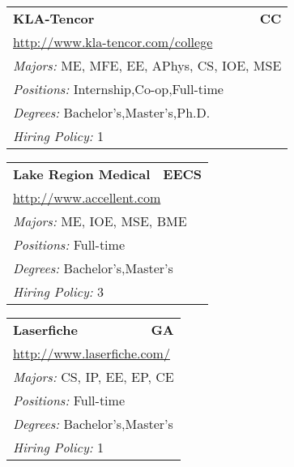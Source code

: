 \documentclass[twoside]{article}
\begin{document}
\begin{center}
\begin{multicols}{3}
\begin{FlushLeft}
\begin{minipage}{.9\columnwidth}
\end{minipage}
 
\begin{minipage}{.9\columnwidth}\begin{tabularx}{.95\columnwidth}{Xr}
                 {\Large\bf KLA-Tencor} & {\Large\bf CC}\\
    \multicolumn{2}{p{.95\columnwidth}}{\url{http://www.kla-tencor.com/college}}\\
    \multicolumn{2}{p{.95\columnwidth}}{\emph{Majors:} ME, MFE, EE, APhys, CS, IOE, MSE}\\
    \multicolumn{2}{p{.95\columnwidth}}{\emph{Positions:} Internship,Co-op,Full-time}\\
    \multicolumn{2}{p{.95\columnwidth}}{\emph{Degrees:} Bachelor's,Master's,Ph.D.}\\
    \multicolumn{2}{p{.95\columnwidth}}{\emph{Hiring Policy:} 1}\\
    \end{tabularx}
    
\end{minipage}
 
\begin{minipage}{.9\columnwidth}\begin{tabularx}{.95\columnwidth}{Xr}
                 {\Large\bf Lake Region Medical} & {\Large\bf EECS}\\
    \multicolumn{2}{p{.95\columnwidth}}{\url{http://www.accellent.com}}\\
    \multicolumn{2}{p{.95\columnwidth}}{\emph{Majors:} ME, IOE, MSE, BME}\\
    \multicolumn{2}{p{.95\columnwidth}}{\emph{Positions:} Full-time}\\
    \multicolumn{2}{p{.95\columnwidth}}{\emph{Degrees:} Bachelor's,Master's}\\
    \multicolumn{2}{p{.95\columnwidth}}{\emph{Hiring Policy:} 3}\\
    \end{tabularx}
    
\end{minipage}
 
\begin{minipage}{.9\columnwidth}\begin{tabularx}{.95\columnwidth}{Xr}
                 {\Large\bf Laserfiche} & {\Large\bf GA}\\
    \multicolumn{2}{p{.95\columnwidth}}{\url{http://www.laserfiche.com/}}\\
    \multicolumn{2}{p{.95\columnwidth}}{\emph{Majors:} CS, IP, EE, EP, CE}\\
    \multicolumn{2}{p{.95\columnwidth}}{\emph{Positions:} Full-time}\\
    \multicolumn{2}{p{.95\columnwidth}}{\emph{Degrees:} Bachelor's,Master's}\\
    \multicolumn{2}{p{.95\columnwidth}}{\emph{Hiring Policy:} 1}\\
    \end{tabularx}
    

\end{minipage}
\end{FlushLeft}
\end{multicols}
\end{center}
\end{document}
